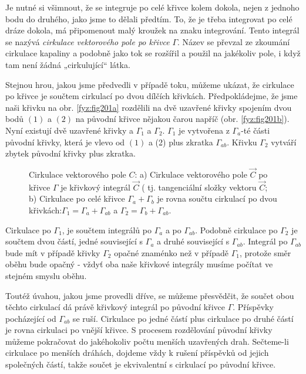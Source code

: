 {    Je nutné si všimnout, že se integruje po celé křivce kolem dokola, nejen z jednoho bodu do 
    druhého, jako jsme to dělali předtím. To, že je třeba integrovat po celé dráze dokola, má 
    připomenout malý kroužek na znaku integrování. Tento integrál se nazývá \emph{cirkulace 
    vektorového pole po křivce} \(\Gamma\). Název se převzal ze zkoumání cirkulace kapaliny a 
    podobně jako tok se rozšířil a použil na jakékoliv pole, i když tam není žádná „cirkulující“ 
    látka.
    
    Stejnou hrou, jakou jsme předvedli v případě toku, můžeme ukázat, že cirkulace po křivce je 
    součtem cirkulací po dvou dílčích křivkách. Předpokládejme, že jsme naši křivku na obr. 
    \ref{fyz:fig201a} rozdělili na dvě uzavřené křivky spojením dvou bodů \((1)\) a \((2)\) na 
    původní křivce nějakou čarou napříč (obr. \ref{fyz:fig201b}). Nyní existují dvě uzavřené 
    křivky  a \(\Gamma_1\) a \(\Gamma_2\). \(\Gamma_1\) je vytvořena z \(\Gamma_a\)-té části 
    původní křivky, která je vlevo od \((1)\) a (2) plus zkratka \(\Gamma_{ab}\). Křivku 
    \(\Gamma_2\) vytváří zbytek původní křivky plus zkratka.
    
    \begin{figure}[ht!]
      \centering
      \caption{Cirkulace vektorového pole \(C\): a) Cirkulace vektorového pole \(\vec{C}\) po 
               křivce \(\Gamma\) je křivkový integrál \(\vec{C}\) ( tj. tangenciální složky vektoru 
               \(\vec{C}\); b) Cirkulace po celé křivce \(\Gamma_a+\Gamma_b\) je rovna součtu 
               cirkulací po dvou křivkách:\(\Gamma_1=\Gamma_a+\Gamma_{ab}\) a \(\Gamma_2=\Gamma_b
               +\Gamma_{ab}\).}
      \label{fyz:fig201}
    \end{figure} 
 
    Cirkulace po \(\Gamma_1\), je součtem integrálů po \(\Gamma_a\) a po \(\Gamma_{ab}\). Podobně 
    cirkulace po \(\Gamma_2\) je součtem dvou částí, jedné související s \(\Gamma_a\) a druhé 
    související s \(\Gamma_{ab}\). Integrál po \(\Gamma_{ab}\) bude mít v případě křivky 
    \(\Gamma_2\) opačné znaménko než v případě \(\Gamma_1\), protože směr oběhu bude opačný - vždyť 
    oba naše křivkové integrály musíme počítat ve stejném smyslu oběhu.
        
    Toutéž úvahou, jakou jsme provedli dříve, se můžeme přesvědčit, že součet obou těchto cirkulací
    dá právě křivkový integrál po původní křivce \(\Gamma\). Příspěvky pocházející od 
    \(\Gamma_{ab}\) se ruší. Cirkulace po jedné částí plus cirkulace po druhé částí je rovna 
    cirkulaci po vnější křivce. S procesem rozdělování původní křivky můžeme pokračovat do 
    jakéhokoliv počtu menších uzavřených drah. Sečteme-li cirkulace po menších dráhách, dojdeme 
    vždy k rušení příspěvků od jejich společných částí, takže součet je ekvivalentní s cirkulací po 
    původní křivce.       

}

